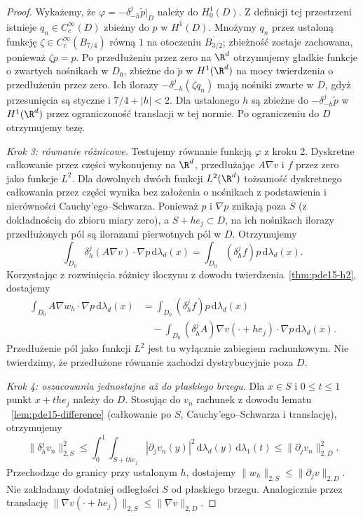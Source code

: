 \begin{proof}
Wykażemy, że $\varphi=-\delta_{-h}^j\widetilde p|_D$
należy do $H_0^1(D)$. Z definicji tej przestrzeni
istnieje $q_n\in C_c^\infty(D)$ zbieżny do $p$ w $H^1(D)$.
Mnożymy $q_n$ przez ustaloną funkcję
$\zeta\in C_c^\infty(B_{7/4})$ równą $1$
na otoczeniu $\overline{B_{3/2}}$; zbieżność zostaje
zachowana, ponieważ $\zeta p=p$. Po przedłużeniu
przez zero na $\R^d$ otrzymujemy gładkie funkcje
o zwartych nośnikach w $D_0$, zbieżne do $\widetilde p$
w $H^1(\R^d)$ na mocy twierdzenia o przedłużeniu przez zero.
Ich ilorazy $-\delta_{-h}^j(\zeta q_n)$ mają nośniki
zwarte w $D$, gdyż przesunięcia są styczne i
$7/4+|h|<2$. Dla ustalonego $h$ są zbieżne do
$-\delta_{-h}^j\widetilde p$ w $H^1(\R^d)$
przez ograniczoność translacji w tej normie.
Po ograniczeniu do $D$ otrzymujemy tezę.

\emph{Krok 3: równanie różnicowe.}
Testujemy równanie funkcją $\varphi$ z kroku 2.
Dyskretne całkowanie przez części wykonujemy na $\R^d$,
przedłużając $A\nabla v$ i $f$ przez zero jako funkcje $L^2$.
Dla dowolnych dwóch funkcji $L^2(\R^d)$ tożsamość
dyskretnego całkowania przez części wynika bez założenia
o nośnikach z podstawienia i nierówności Cauchy'ego--Schwarza.
Ponieważ $p$ i $\nabla p$ znikają poza $\overline S$
(z dokładnością do zbioru miary zero), a $S+he_j\subset D$,
na ich nośnikach ilorazy przedłużonych pól są ilorazami
pierwotnych pól w $D$. Otrzymujemy
\[
 \int_{D_0}\delta_h^j(A\nabla v)\cdot\nabla p\,\mathrm d\lambda_d(x)
 =\int_{D_0}(\delta_h^jf)p\,\mathrm d\lambda_d(x).
\]
Korzystając z rozwinięcia różnicy iloczynu
z dowodu twierdzenia~\ref{thm:pde15-h2}, dostajemy
\[
 \begin{aligned}
 \int_{D_0}A\nabla w_h\cdot\nabla p\,\mathrm d\lambda_d(x)
 &=\int_{D_0}(\delta_h^jf)p\,\mathrm d\lambda_d(x)\\
 &\quad-\int_{D_0}(\delta_h^jA)\nabla v(\cdot+he_j)
          \cdot\nabla p\,\mathrm d\lambda_d(x).
 \end{aligned}
\]
Przedłużenie pól jako funkcji $L^2$ jest tu wyłącznie
zabiegiem rachunkowym. Nie twierdzimy, że przedłużone
równanie zachodzi dystrybucyjnie poza $D$.

\emph{Krok 4: oszacowania jednostajne aż do płaskiego brzegu.}
Dla $x\in S$ i $0\le t\le1$ punkt $x+the_j$ należy
do $D$. Stosując do $v_n$ rachunek z dowodu lematu
~\ref{lem:pde15-difference} (całkowanie po $S$,
Cauchy'ego--Schwarza i translację), otrzymujemy
\[
 \|\delta_h^jv_n\|_{2,S}^2
 \le\int_0^1\int_{S+the_j}|\partial_jv_n(y)|^2\,
       \mathrm d\lambda_d(y)\,\mathrm d\lambda_1(t)
 \le\|\partial_jv_n\|_{2,D}^2.
\]
Przechodząc do granicy przy ustalonym $h$, dostajemy
$\|w_h\|_{2,S}\le\|\partial_jv\|_{2,D}$.
Nie zakładamy dodatniej odległości $S$ od płaskiego brzegu.
Analogicznie przez translację
$\|\nabla v(\cdot+he_j)\|_{2,S}\le\|\nabla v\|_{2,D}$.


\end{proof}
